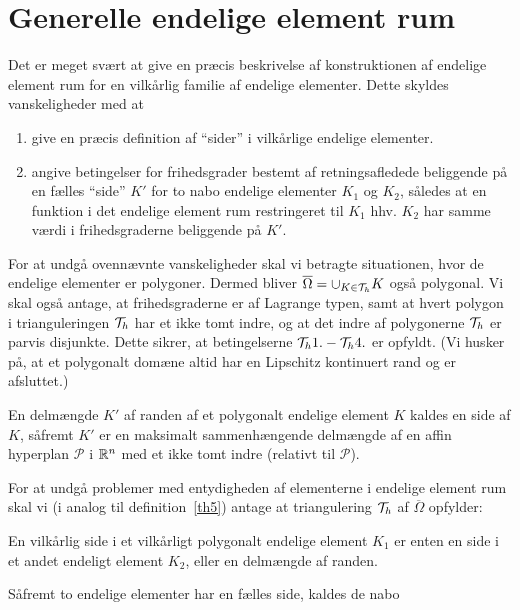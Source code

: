 \section{Generelle endelige element rum}
Det er meget svært at give en præcis beskrivelse af konstruktionen af 
endelige element rum for en vilkårlig familie af endelige elementer. Dette
skyldes vanskeligheder med at
\begin{enumerate}
  \item give en præcis definition af ``sider'' i vilkårlige endelige
        elementer.
  \item angive betingelser for frihedsgrader bestemt af retningsafledede
        beliggende på en fælles ``side'' $K'$ for to nabo endelige 
        elementer $K_1$ og $K_2$, således at en funktion i det endelige 
        element rum restringeret til $K_1$ hhv. $K_2$ har samme værdi i 
        frihedsgraderne beliggende på $K'$.
\end{enumerate}
For at undgå ovennævnte vanskeligheder skal vi betragte situationen, hvor
de endelige elementer er polygoner. Dermed bliver 
$\overline{\Omega}= \cup_{K\in {\cal{T}}_h} K$ også polygonal. Vi skal også antage,
at frihedsgraderne er af Lagrange typen, samt at hvert polygon i
triangulering\-en ${\cal{T}}_h$ har et ikke tomt indre, og at det indre af
polygonerne ${\cal{T}}_h$ er parvis disjunkte. Dette sikrer, at betingelserne
${\cal{T}}_h 1.-{\cal{T}}_h 4.$ er opfyldt. (Vi husker på, at et polygonalt domæne altid
har en Lipschitz kontinuert rand og er afsluttet.)
\begin{definition}
En delmængde $K'$ af randen af et polygonalt endelige element $K$ kaldes
en side af $K$, såfremt $K'$ er en maksimalt sammenhængende delmængde af en
affin hyperplan ${\mathcal P}$ i $\mathbb{R}^n$ med et ikke tomt indre (relativt til
${\mathcal P}$).
\end{definition}
\begin{definition}
For at undgå problemer med entydigheden af elementerne i endelige element 
rum skal vi (i analog til definition~\ref{th5}) antage at triangulering ${\cal{T}}_h$ af 
$\overline{\Omega}$ opfylder:
\begin{Thenumerate}
  \setcounter{enumi}{4}
  \item En vilkårlig side i et vilkårligt polygonalt endelige element $K_1$
        er enten en side i et andet endeligt element $K_2$, eller en 
        delmængde af randen.
\end{Thenumerate}
\end{definition}
Såfremt to endelige elementer har en fælles side, kaldes de nabo
